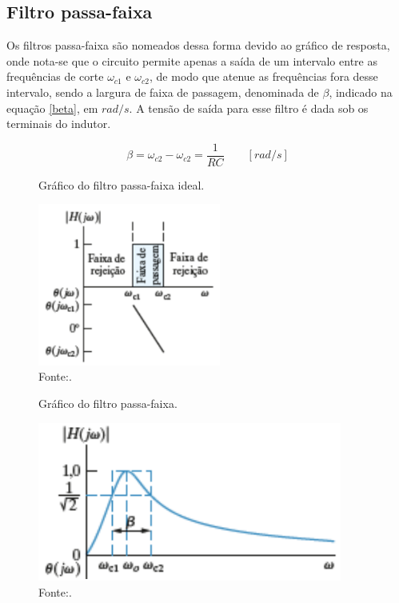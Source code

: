 \subsection{Filtro passa-faixa}

Os filtros passa-faixa são nomeados dessa forma devido ao gráfico de resposta, onde nota-se que o circuito permite apenas a saída de um intervalo entre as frequências de corte $\omega_{c1}$ e $\omega_{c2}$, de modo que atenue as frequências fora desse intervalo, sendo a largura de faixa de passagem, denominada de $\beta$, indicado na equação \ref{beta}, em $rad/s$. A tensão de saída para esse filtro é dada sob os terminais do indutor.

\begin{equation}
	\beta = \omega_{c2} - \omega_{c2} = \frac{1}{RC} \qquad [rad/s]
	\label{beta}
\end{equation}

\begin{figure}[ht]
	\centering
	\caption{Gráfico do filtro passa-faixa ideal.}
	\includegraphics[width=6cm]{imagens/graficoPassaFaixaIdeal.png}
	\caption*{Fonte:\cite{nilsson2008circuitos}.}
	\label{graficoPassaFaixaIdeal}
\end{figure}

\begin{figure}[ht]
	\centering
	\caption{Gráfico do filtro passa-faixa.}
	\includegraphics[width=10cm]{imagens/graficoFiltroPassaFaixa.png}
	\caption*{Fonte:\cite{nilsson2008circuitos}.}
\end{figure}

